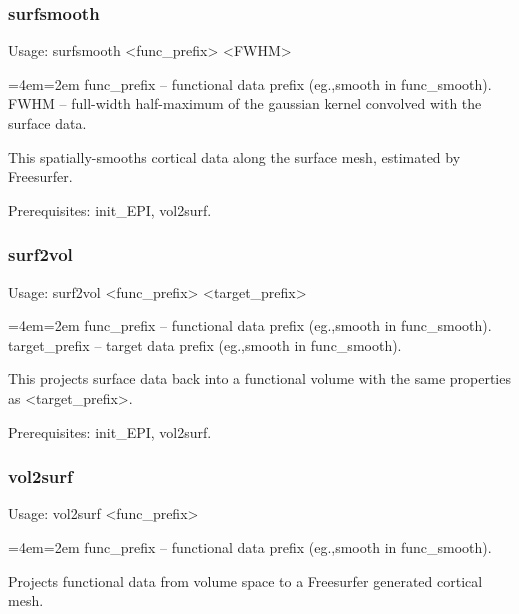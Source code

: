 \documentclass[final,titlepage,letterpaper,oneside,12pt]{article}
\renewcommand{\texttt}[2][BrickRed]{\textcolor{#1}{\ttfamily #2}}%
\newenvironment{blockquote}{%
  \par%
  \medskip
  \leftskip=4em\rightskip=2em%
  \noindent\ignorespaces}{%
  \par\medskip}
\begin{document}
\subsubsection{surfsmooth}
Usage: \texttt{surfsmooth <func\_prefix> <FWHM>}

\begin{blockquote}
func\_prefix -- functional data prefix (eg.,smooth in func\_smooth). \\
FWHM -- full-width half-maximum of the gaussian kernel convolved with the surface data. \
\end{blockquote}

\noindent This spatially-smooths cortical data along the surface mesh, estimated by Freesurfer.

Prerequisites: \texttt{init\_EPI}, \texttt{vol2surf}.

\subsubsection{surf2vol}
Usage: \texttt{surf2vol <func\_prefix> <target\_prefix>}

\begin{blockquote}
func\_prefix -- functional data prefix (eg.,smooth in func\_smooth). \\
target\_prefix -- target data prefix (eg.,smooth in func\_smooth). \
\end{blockquote}

\noindent This projects surface data back into a functional volume with the same properties as <target\_prefix>.

Prerequisites: \texttt{init\_EPI}, \texttt{vol2surf}.

\subsubsection{vol2surf}
Usage: \texttt{vol2surf <func\_prefix>}

\begin{blockquote}
func\_prefix -- functional data prefix (eg.,smooth in func\_smooth).
\end{blockquote}

\noindent Projects functional data from volume space to a Freesurfer generated cortical mesh.
\end{document}
